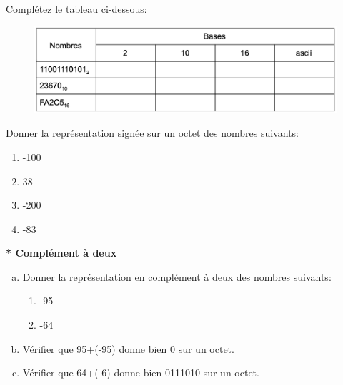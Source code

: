 \documentclass[11pt, a4paper]{book}
\begin{document}
\begin{exercice}
Complétez le tableau ci-dessous:

\end{exercice}
\begin{figure}[h]
\begin{center}
\includegraphics[scale=.25]{images/tableauconversion}
\end{center}
\end{figure}



\begin{exercice}
Donner la représentation signée sur un octet des nombres suivants:
\begin{multicols}{2}
\begin{enumerate}
 	\item -100
 	\item 38
 	\item -200
 	\item -83
\end{enumerate}
\end{multicols}
\end{exercice}


\begin{exercice}\textbf{* Complément à deux }
\begin{enumerate}[a)]
\item Donner la représentation en complément à deux des nombres suivants:

\begin{enumerate}
\item -95
\item -64
\end{enumerate}

\item Vérifier que 95+(-95) donne bien 0 sur un octet.
\item Vérifier que 64+(-6) donne bien 0111010 sur un octet.
\end{enumerate}
\end{exercice}
\end{document}
